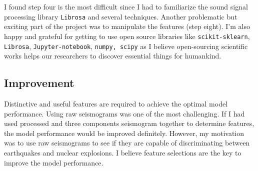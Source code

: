 \documentclass[12pt]{article}
\begin{document}
        I found step four is the most difficult since I had to familiarize the sound signal processing library \texttt{Librosa} and several techniques. Another problematic but exciting part of the project was to manipulate the features (step eight). I’m also happy and grateful for getting to use open source libraries like \texttt{scikit-sklearn}, \texttt{Librosa}, \texttt{Jupyter-notebook}, \texttt{numpy, scipy} as I believe open-sourcing scientific works helps our researchers to discover essential things for humankind.
    
        \subsection{Improvement}
        Distinctive and useful features are required to achieve the optimal model performance. Using raw seismograms was one of the most challenging. If I had used processed and three components seismogram together to determine features,  the model performance would be improved definitely. However, my motivation was to use raw seismograms to see if they are capable of discriminating between earthquakes and nuclear explosions. I believe feature selections are the key to improve the model performance.
        
        
        
        
        
\end{document}
